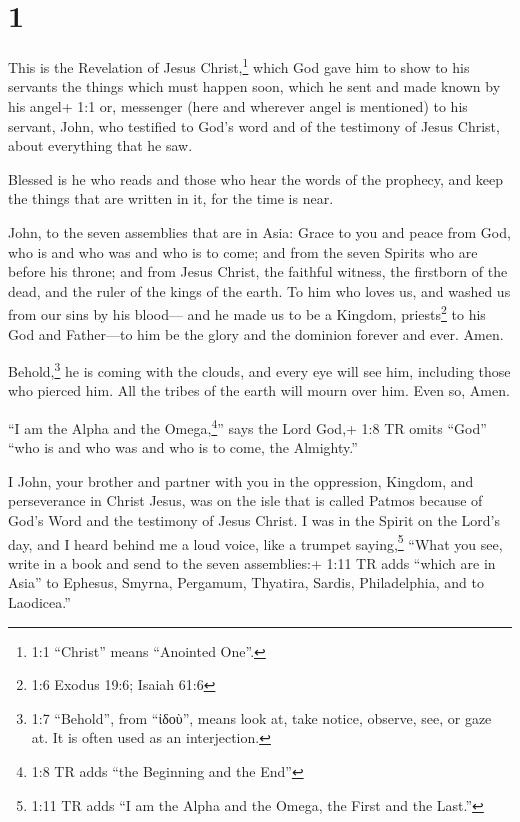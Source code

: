 \hypertarget{section}{%
\section{1}\label{section}}

 This is the Revelation of Jesus Christ,\footnote{1:1
  ``Christ'' means ``Anointed One''.} which God gave him to show to his
servants the things which must happen soon, which he sent and made known
by his angel+ 1:1 or, messenger (here and wherever angel is mentioned)
to his servant, John,  who testified to God's word and of
the testimony of Jesus Christ, about everything that he saw.

 Blessed is he who reads and those who hear the words of the
prophecy, and keep the things that are written in it, for the time is
near.

 John, to the seven assemblies that are in Asia: Grace to
you and peace from God, who is and who was and who is to come; and from
the seven Spirits who are before his throne;  and from Jesus
Christ, the faithful witness, the firstborn of the dead, and the ruler
of the kings of the earth. To him who loves us, and washed us from our
sins by his blood---  and he made us to be a Kingdom,
priests\footnote{1:6 Exodus 19:6; Isaiah 61:6} to his God and
Father---to him be the glory and the dominion forever and ever. Amen.

 Behold,\footnote{1:7 ``Behold'', from ``ἰδοὺ'', means look
  at, take notice, observe, see, or gaze at. It is often used as an
  interjection.} he is coming with the clouds, and every eye will see
him, including those who pierced him. All the tribes of the earth will
mourn over him. Even so, Amen.

 ``I am the Alpha and the Omega,\footnote{1:8 TR adds ``the
  Beginning and the End''}'' says the Lord God,+ 1:8 TR omits ``God''
``who is and who was and who is to come, the Almighty.''

 I John, your brother and partner with you in the
oppression, Kingdom, and perseverance in Christ Jesus, was on the isle
that is called Patmos because of God's Word and the testimony of Jesus
Christ.  I was in the Spirit on the Lord's day, and I heard
behind me a loud voice, like a trumpet  saying,\footnote{1:11
  TR adds ``I am the Alpha and the Omega, the First and the Last.''}
``What you see, write in a book and send to the seven assemblies:+ 1:11
TR adds ``which are in Asia'' to Ephesus, Smyrna, Pergamum, Thyatira,
Sardis, Philadelphia, and to Laodicea.''

